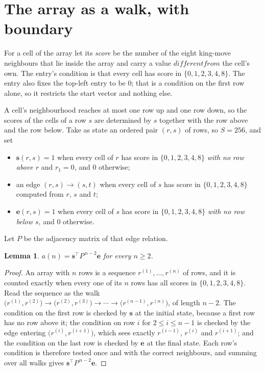 \documentclass[11pt,a4paper]{article}
\theoremstyle{plain}
\newtheorem{lemma}[theorem]{Lemma}
\theoremstyle{definition}
\begin{document}
\section{The array as a walk, with boundary}

For a cell of the array let its \emph{score} be the number of the eight king-move neighbours that lie inside
the array and carry a value $different from$ the cell's own. The entry's condition is that every cell
has score in $\{0,1,2,3,4,8\}$. The entry also fixes the top-left entry to be $0$; that is a condition on the first row alone, so it restricts the start vector and nothing else.

A cell's neighbourhood reaches at most one row up and one row down, so the scores of the
cells of a row $s$ are determined by $s$ together with the row above and the row below.
Take as state an ordered pair $(r,s)$ of rows, so $S=256$, and set
\begin{itemize}
\item $\mathbf{s}(r,s)=1$ when every cell of $r$ has score in $\{0,1,2,3,4,8\}$ \emph{with no row
above $r$} and $r_1=0$, and $0$ otherwise;
\item an edge $(r,s)\to(s,t)$ when every cell of $s$ has score in $\{0,1,2,3,4,8\}$ computed from
$r$, $s$ and $t$;
\item $\mathbf{e}(r,s)=1$ when every cell of $s$ has score in $\{0,1,2,3,4,8\}$ \emph{with no row
below $s$}, and $0$ otherwise.
\end{itemize}
Let $P$ be the adjacency matrix of that edge relation.

\begin{lemma}\label{lem:walk}
$a(n)=\mathbf{s}^{\!\top}P^{\,n-2}\mathbf{e}$ for every $n\ge2$.
\end{lemma}

\begin{proof}
An array with $n$ rows is a sequence $r^{(1)},\dots,r^{(n)}$ of rows, and it is counted
exactly when every one of its $n$ rows has all scores in $\{0,1,2,3,4,8\}$. Read the sequence as the
walk $\bigl(r^{(1)},r^{(2)}\bigr)\to\bigl(r^{(2)},r^{(3)}\bigr)\to\cdots\to
\bigl(r^{(n-1)},r^{(n)}\bigr)$, of length $n-2$. The condition on the first row is
checked by $\mathbf{s}$ at the initial state, because a first row has no row above it; the
condition on row $i$ for $2\le i\le n-1$ is checked by the edge entering
$\bigl(r^{(i)},r^{(i+1)}\bigr)$, which sees exactly $r^{(i-1)}$, $r^{(i)}$ and
$r^{(i+1)}$; and the condition on the last row is checked by $\mathbf{e}$ at the final
state. Each row's condition is therefore tested once and with the correct neighbours, and
summing over all walks gives $\mathbf{s}^{\!\top}P^{\,n-2}\mathbf{e}$.
\end{proof}
\end{document}
